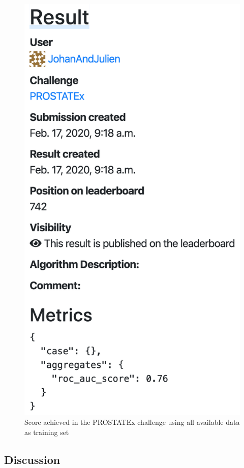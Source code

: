 \begin{figure}[!h]
\centering
\includegraphics[height=0.4\textheight, keepaspectratio=true]{./figures/paper_reproduction_results_challenge2.png}
\caption{Score achieved in the PROSTATEx challenge using all available data as training set}
\label{fig:paper_reprodution_results_challenge2}
\end{figure}



\subsection{Discussion}
